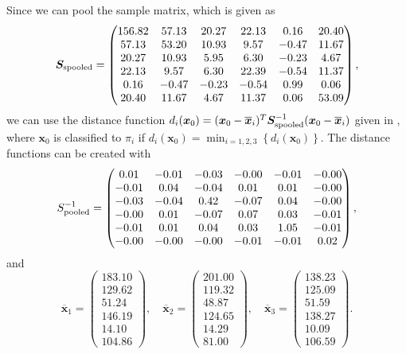 \message{ !name(examination.tex)}\documentclass[one column]{report}
\renewcommand{\b}[1]{\bm{#1}}
\newcommand{\mean}[1]{\overline{\b{#1}}}
\begin{document}
Since we can pool the sample matrix, which is given as
\begin{equation*}
  \b S_{\rm spooled} =
  \begin{pmatrix}
    156.82 &57.13 &20.27 &22.13 &0.16 &20.40 \\ 
    57.13 &53.20 &10.93 &9.57 &-0.47 &11.67 \\ 
    20.27 &10.93 &5.95 &6.30 &-0.23 &4.67 \\ 
    22.13 &9.57 &6.30 &22.39 &-0.54 &11.37 \\ 
    0.16 &-0.47 &-0.23 &-0.54 &0.99 &0.06 \\ 
    20.40 &11.67 &4.67 &11.37 &0.06 &53.09 
  \end{pmatrix},
\end{equation*}
we can use the distance function $d_{i}(\b x_{0}) = (\b x_{0} - \mean
x_{i})^{T} \b S_{\rm spooled}^{-1} (\b x_{0} - \mean
x_{i})$ given in \cite[p. 611]{book}, where  $\b x_{0}$ is classified to
$\pi_{i}$ if $d_{i}(\b x_{0}) = \min_{i = 1, 2, 3}
\left\{
    d_{i}(\b x_{0})
\right\}$. The distance functions can be created with
\begin{equation*}
  S_{\rm pooled}^{-1} =
  \begin{pmatrix}
    0.01 &-0.01 &-0.03 &-0.00 &-0.01 &-0.00 \\ 
    -0.01 &0.04 &-0.04 &0.01 &0.01 &-0.00 \\ 
    -0.03 &-0.04 &0.42 &-0.07 &0.04 &-0.00 \\ 
    -0.00 &0.01 &-0.07 &0.07 &0.03 &-0.01 \\ 
    -0.01 &0.01 &0.04 &0.03 &1.05 &-0.01 \\ 
    -0.00 &-0.00 &-0.00 &-0.01 &-0.01 &0.02  
  \end{pmatrix},
\end{equation*}
and 
\begin{equation*}
  \mean x_{1} =
  \begin{pmatrix}
    183.10 \\ 
    129.62 \\ 
    51.24 \\ 
    146.19 \\ 
    14.10 \\ 
    104.86 
  \end{pmatrix}, \quad 
  \mean x_{2} =
  \begin{pmatrix}
    201.00 \\ 
    119.32 \\ 
    48.87 \\ 
    124.65 \\ 
    14.29 \\ 
    81.00  
  \end{pmatrix}, \quad 
  \mean x_{3} =
  \begin{pmatrix}
    138.23 \\ 
    125.09 \\ 
    51.59 \\ 
    138.27 \\ 
    10.09 \\ 
    106.59
  \end{pmatrix}.
\end{equation*}
\end{document}
